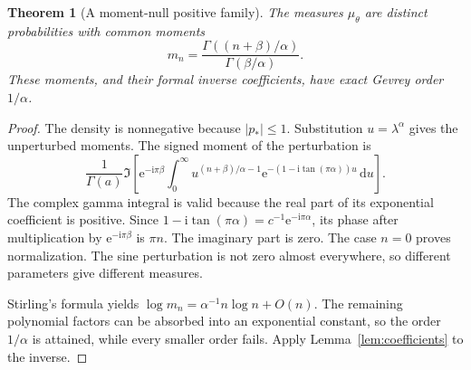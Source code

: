 \documentclass[11pt,a4paper]{article}
\numberwithin{equation}{section}
\newtheorem{theorem}{Theorem}[section]
\theoremstyle{definition}
\theoremstyle{remark}
\newcommand{\dd}{\,\mathrm d}
\newcommand{\ii}{\mathrm i}
\newcommand{\ee}{\mathrm e}
\begin{document}
\begin{theorem}[A moment-null positive family]
\label{thm:gamma}
The measures \(\mu_\theta\) are distinct probabilities with common moments
\begin{equation}
 m_n=\frac{\Gamma((n+\beta)/\alpha)}{\Gamma(\beta/\alpha)}.
 \label{eq:gamma-moments}
\end{equation}
These moments, and their formal inverse coefficients, have exact Gevrey
order \(1/\alpha\).
\end{theorem}
\begin{proof}
The density is nonnegative because \(|p_*|\le1\). Substitution
\(u=\lambda^\alpha\) gives the unperturbed moments. The signed moment
of the perturbation is
\[
 \frac1{\Gamma(a)}\Im\left[
 \ee^{-\ii\pi\beta}
 \int_0^\infty u^{(n+\beta)/\alpha-1}
 \ee^{-(1-\ii\tan(\pi\alpha))u}\dd u\right].
\]
The complex gamma integral is valid because the real part of its
exponential coefficient is positive. Since
\(1-\ii\tan(\pi\alpha)=c^{-1}\ee^{-\ii\pi\alpha}\),
its phase after multiplication by \(\ee^{-\ii\pi\beta}\) is
\(\pi n\). The imaginary part is zero. The case \(n=0\) proves
normalization. The sine perturbation is not zero almost everywhere, so
different parameters give different measures.

Stirling's formula yields
\(\log m_n=\alpha^{-1}n\log n+O(n)\).
The remaining polynomial factors can be absorbed into an exponential
constant, so the order \(1/\alpha\) is attained, while every smaller
order fails. Apply Lemma~\ref{lem:coefficients} to the inverse.
\end{proof}
\end{document}

